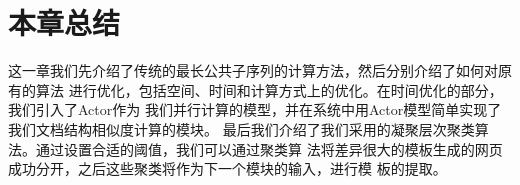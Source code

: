 \section{本章总结}
\label{sec:summarycluster}
这一章我们先介绍了传统的最长公共子序列的计算方法，然后分别介绍了如何对原有的算法
进行优化，包括空间、时间和计算方式上的优化。在时间优化的部分，我们引入了Actor作为
我们并行计算的模型，并在系统中用Actor模型简单实现了我们文档结构相似度计算的模块。
最后我们介绍了我们采用的凝聚层次聚类算法。通过设置合适的阈值，我们可以通过聚类算
法将差异很大的模板生成的网页成功分开，之后这些聚类将作为下一个模块的输入，进行模
板的提取。
